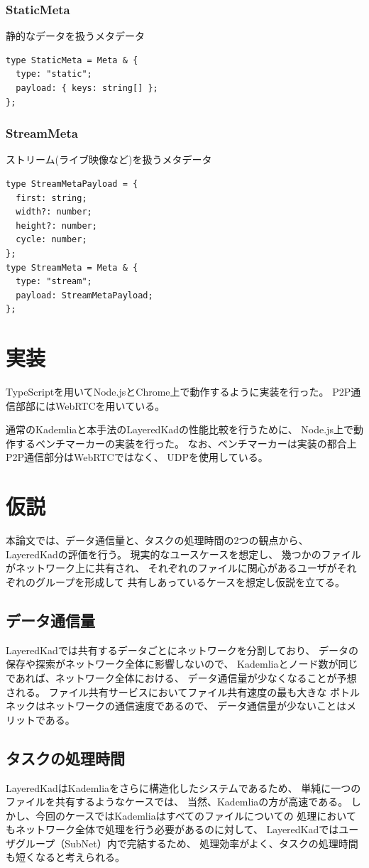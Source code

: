 \documentclass[sotsuron]{jcsie}
\begin{document}
\subsubsection{StaticMeta}
静的なデータを扱うメタデータ
\begin{lstlisting}
type StaticMeta = Meta & {
  type: "static";
  payload: { keys: string[] };
};
\end{lstlisting}
\subsubsection{StreamMeta}
ストリーム(ライブ映像など)を扱うメタデータ
\begin{lstlisting}
type StreamMetaPayload = {
  first: string;
  width?: number;
  height?: number;
  cycle: number;
};	
type StreamMeta = Meta & {
  type: "stream";
  payload: StreamMetaPayload;
};  
\end{lstlisting}

\section{実装}
TypeScriptを用いてNode.jsとChrome上で動作するように実装を行った。
P2P通信部部にはWebRTCを用いている。

通常のKademliaと本手法のLayeredKadの性能比較を行うために、
Node.js上で動作するベンチマーカーの実装を行った。
なお、ベンチマーカーは実装の都合上P2P通信部分はWebRTCではなく、
UDPを使用している。

\section{仮説}
本論文では、データ通信量と、タスクの処理時間の2つの観点から、
LayeredKadの評価を行う。
現実的なユースケースを想定し、
幾つかのファイルがネットワーク上に共有され、
それぞれのファイルに関心があるユーザがそれぞれのグループを形成して
共有しあっているケースを想定し仮説を立てる。
\subsection{データ通信量}
LayeredKadでは共有するデータごとにネットワークを分割しており、
データの保存や探索がネットワーク全体に影響しないので、
Kademliaとノード数が同じであれば、ネットワーク全体における、
データ通信量が少なくなることが予想される。
ファイル共有サービスにおいてファイル共有速度の最も大きな
ボトルネックはネットワークの通信速度であるので、
データ通信量が少ないことはメリットである。
\subsection{タスクの処理時間}
LayeredKadはKademliaをさらに構造化したシステムであるため、
単純に一つのファイルを共有するようなケースでは、
当然、Kademliaの方が高速である。
しかし、今回のケースではKademliaはすべてのファイルについての
処理においてもネットワーク全体で処理を行う必要があるのに対して、
LayeredKadではユーザグループ（SubNet）内で完結するため、
処理効率がよく、タスクの処理時間も短くなると考えられる。
\end{document}
